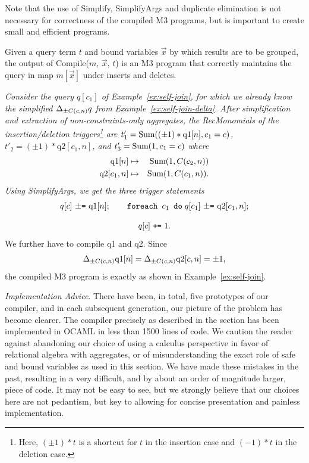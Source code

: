 Note that the use of Simplify, SimplifyArgs and duplicate elimination
is not necessary for correctness of the compiled M3 programs, but is important
to create small and efficient programs.


\begin{theorem}
Given a query term $t$ and bound variables $\vec{x}$ by which results
are to be grouped,
the output of Compile($m$, $\vec{x}$, $t$) is an M3 program that
correctly maintains the query in map $m[\vec{x}]$ under inserts and deletes.
\end{theorem}



\begin{example}\em
\label{ex:self-join-compile}
Consider the query $q[c_1]$ of
Example~\ref{ex:self-join}, for which we already know
the simplified $\Delta_{\pm C(c,n)} q$ from Example~\ref{ex:self-join-delta}.
After simplification and extraction of non-constraints-only aggregates,
the RecMonomials of the insertion/deletion triggers\footnote{Here,
$(\pm 1) * t$ is a shortcut for $t$ in the insertion case and
$(-1)*t$ in the deletion case.} are
$t'_1 = \mbox{Sum}((\pm 1) * \mbox{q1}[n], c_1=c)$,
$t'_2 = (\pm 1) * \mbox{q2}[c_1, n]$, and
$t'_3 = \mbox{Sum}(1, c_1=c)$
where
\begin{eqnarray*}
\mbox{q1}[n] &\mapsto& \mbox{Sum}(1, C(c_2, n)) \\
\mbox{q2}[c_1, n] &\mapsto& \mbox{Sum}(1, C(c_1,n)).
\end{eqnarray*}
Using SimplifyArgs, we get the three trigger statements
\[
q[c] \mbox{ {\tt $\pm$=} q1}[n]; \quad\quad
\mbox{{\tt foreach $c_1$ do}} \; q[c_1] \mbox{ {\tt $\pm$=} q2}[c_1, n];
\]

\vspace{-6mm}

\[
q[c] \mbox{ {\tt +=} } 1.
\]
We further have to compile q1 and q2. Since
\[
\Delta_{\pm C(c,n)} \mbox{q1}[n] = \Delta_{\pm C(c,n)} \mbox{q2}[c,n] = \pm 1,
\]
the compiled M3 program is exactly as shown in Example~\ref{ex:self-join}.
\punto
\end{example}


{\em Implementation Advice}.
There have been, in total, five prototypes of our compiler, and
in each subsequent generation, our picture of the problem has become clearer.
The compiler precisely as described in the section has been implemented
in OCAML in less than 1500 lines of code. We caution the reader against
abandoning our choice of using a calculus perspective
in favor of relational algebra with aggregates, or of misunderstanding
the exact role of safe and bound variables as used in this section.
We have made these mistakes in the past, resulting in 
a very difficult, and by about an order of magnitude larger, piece of code.
It may not be easy to see, but we strongly believe that
our choices here are not pedantism,
but key to allowing for concise presentation
and painless implementation.



